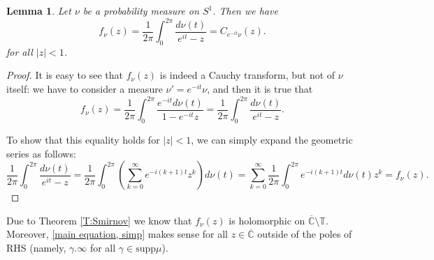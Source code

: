 \documentclass[11pt]{article}
\newtheorem{lemma}{Lemma}[section]
\begin{document}
\begin{lemma}
	\label{T:Cauchy transform}
	Let $\nu$ be a probability measure on $S^1$. Then we have
	\begin{equation}
		\label{E:Cauchy transform}
		f_\nu(z) = \frac{1}{2 \pi} \int_0^{2 \pi} \dfrac{d \nu(t)}{e^{i t} - z} = C_{e^{-it}\nu}(z).
	\end{equation}
	for all $|z| < 1$.
\end{lemma}
\begin{proof}
	It is easy to see that $f_\nu(z)$ is indeed a Cauchy transform, but not of $\nu$ itself: we have to consider a measure $\nu' = e^{-it} \nu$, and then it is true that
	\[
	f_\nu(z) = \frac{1}{2 \pi} \int_{0}^{2\pi} \frac{e^{-it} d\nu(t)}{1 - e^{-it} z} = \frac{1}{2 \pi} \int_{0}^{2 \pi} \frac{d\nu(t)}{e^{it} -  z}.
	\]
	
	To show that this equality holds for $|z| < 1$, we can simply expand the geometric series as follows:
	\[
	\frac{1}{2 \pi} \int_0^{2 \pi} \dfrac{d \nu(t)}{e^{i t} - z} = \frac{1}{2 \pi} \int_0^{2 \pi} \left( \sum_{k=0}^\infty e^{-i (k+1) t} z^k \right)  d\nu(t) = \sum_{k=0}^\infty \frac{1}{2 \pi} \int_0^{2 \pi} e^{-i (k+1) t} d \nu(t) z^k = f_\nu(z).
	\]
\end{proof}

Due to Theorem \ref{T:Smirnov} we know that $f_\nu(z)$ is holomorphic on $\overline{\mathbb{C}} \setminus \mathbb{T}$. Moreover, \eqref{main equation, simp} makes sense for all $z \in \overline{\mathbb{C}}$ outside of the poles of RHS (namely, $\gamma.\infty$ for all $\gamma \in \text{supp} \mu$). 
\end{document}

